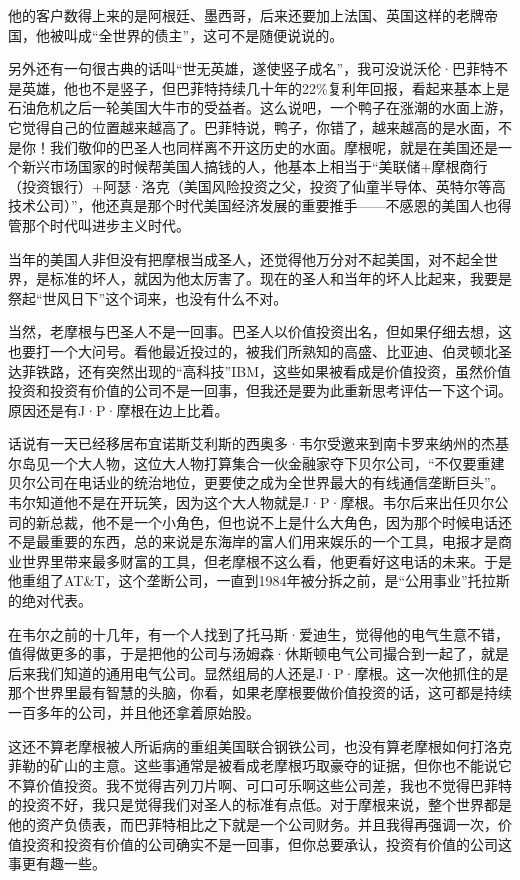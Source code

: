 他的客户数得上来的是阿根廷、墨西哥，后来还要加上法国、英国这样的老牌帝国，他被叫成``全世界的债主''，这可不是随便说说的。

另外还有一句很古典的话叫``世无英雄，遂使竖子成名''，我可没说沃伦·巴菲特不是英雄，他也不是竖子，但巴菲特持续几十年的22\%复利年回报，看起来基本上是石油危机之后一轮美国大牛市的受益者。这么说吧，一个鸭子在涨潮的水面上游，它觉得自己的位置越来越高了。巴菲特说，鸭子，你错了，越来越高的是水面，不是你！我们敬仰的巴圣人也同样离不开这历史的水面。摩根呢，就是在美国还是一个新兴市场国家的时候帮美国人搞钱的人，他基本上相当于``美联储+摩根商行（投资银行）+阿瑟·洛克（美国风险投资之父，投资了仙童半导体、英特尔等高技术公司）''，他还真是那个时代美国经济发展的重要推手------不感恩的美国人也得管那个时代叫进步主义时代。

当年的美国人非但没有把摩根当成圣人，还觉得他万分对不起美国，对不起全世界，是标准的坏人，就因为他太厉害了。现在的圣人和当年的坏人比起来，我要是祭起``世风日下''这个词来，也没有什么不对。

当然，老摩根与巴圣人不是一回事。巴圣人以价值投资出名，但如果仔细去想，这也要打一个大问号。看他最近投过的，被我们所熟知的高盛、比亚迪、伯灵顿北圣达菲铁路，还有突然出现的``高科技''IBM，这些如果被看成是价值投资，虽然价值投资和投资有价值的公司不是一回事，但我还是要为此重新思考评估一下这个词。原因还是有J·P·摩根在边上比着。

话说有一天已经移居布宜诺斯艾利斯的西奥多·韦尔受邀来到南卡罗来纳州的杰基尔岛见一个大人物，这位大人物打算集合一伙金融家夺下贝尔公司，``不仅要重建贝尔公司在电话业的统治地位，更要使之成为全世界最大的有线通信垄断巨头''。韦尔知道他不是在开玩笑，因为这个大人物就是J·P·摩根。韦尔后来出任贝尔公司的新总裁，他不是一个小角色，但也说不上是什么大角色，因为那个时候电话还不是最重要的东西，总的来说是东海岸的富人们用来娱乐的一个工具，电报才是商业世界里带来最多财富的工具，但老摩根不这么看，他更看好这电话的未来。于是他重组了AT\&T，这个垄断公司，一直到1984年被分拆之前，是``公用事业''托拉斯的绝对代表。

在韦尔之前的十几年，有一个人找到了托马斯·爱迪生，觉得他的电气生意不错，值得做更多的事，于是把他的公司与汤姆森·休斯顿电气公司撮合到一起了，就是后来我们知道的通用电气公司。显然组局的人还是J·P·摩根。这一次他抓住的是那个世界里最有智慧的头脑，你看，如果老摩根要做价值投资的话，这可都是持续一百多年的公司，并且他还拿着原始股。

这还不算老摩根被人所诟病的重组美国联合钢铁公司，也没有算老摩根如何打洛克菲勒的矿山的主意。这些事通常是被看成老摩根巧取豪夺的证据，但你也不能说它不算价值投资。我不觉得吉列刀片啊、可口可乐啊这些公司差，我也不觉得巴菲特的投资不好，我只是觉得我们对圣人的标准有点低。对于摩根来说，整个世界都是他的资产负债表，而巴菲特相比之下就是一个公司财务。并且我得再强调一次，价值投资和投资有价值的公司确实不是一回事，但你总要承认，投资有价值的公司这事更有趣一些。

